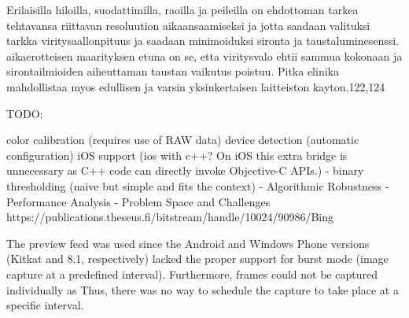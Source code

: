 \documentclass[thesis.tex]{subfiles}
\begin{document}
Erilaisilla hiloilla, suodattimilla, raoilla ja peileilla on ehdottoman tarkea tehtavansa riittavan resoluution aikaansaamiseksi ja jotta saadaan valituksi tarkka viritysaallonpituus ja saadaan minimoiduksi sironta ja taustaluminesenssi. aikaerotteisen maarityksen etuna on se, etta viritysvalo ehtii sammua kokonaan ja sirontailmioiden aiheuttaman taustan vaikutus poistuu. Pitka elinika mahdollistaa myos edullisen ja varsin yksinkertaisen laitteiston kayton.122,124

TODO:

color calibration (requires use of RAW data)
device detection (automatic configuration)
iOS support (ios with c++? On iOS this extra bridge is unnecessary as C++ code can directly invoke Objective-C APIs.)
- binary thresholding (naive but simple and fits the context)
- Algorithmic Robustness
- Performance Analysis
- Problem Space and Challenges
https://publications.theseus.fi/bitstream/handle/10024/90986/Bing%




The preview feed was used since the Android and Windows Phone versions (Kitkat and 8.1, respectively) lacked the proper support for burst mode (image capture at a predefined interval). Furthermore, frames could not be captured individually as Thus, there was no way to schedule the capture to take place at a specific interval.
\end{document}

